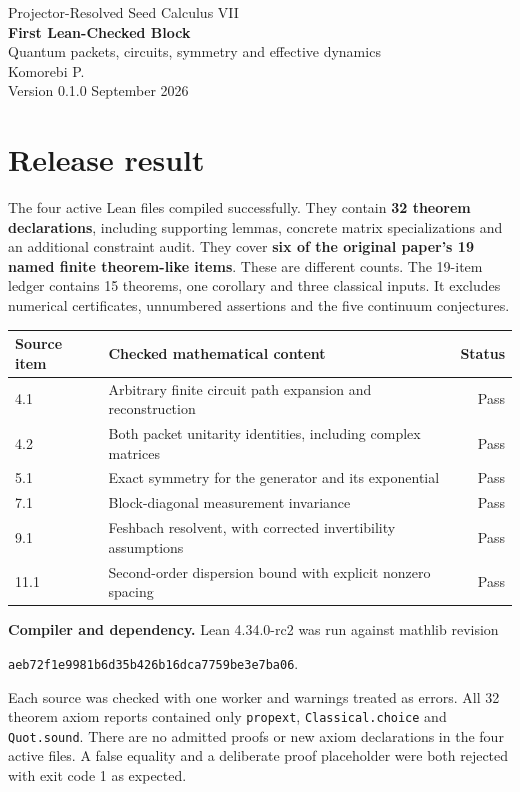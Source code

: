 \documentclass[11pt]{article}
\newcommand{\code}[1]{{\small\nolinkurl{#1}}}
\begin{document}
\thispagestyle{empty}
\begin{center}
{\large Projector-Resolved Seed Calculus VII}\\[7pt]
{\LARGE\bfseries First Lean-Checked Block}\\[9pt]
{\large Quantum packets, circuits, symmetry and effective dynamics}\\[12pt]
Komorebi P.\\
Version 0.1.0\quad\textbar{} September 2026
\end{center}

\section*{Release result}
The four active Lean files compiled successfully. They contain \textbf{32 theorem declarations}, including supporting lemmas, concrete matrix specializations and an additional constraint audit. They cover \textbf{six of the original paper's 19 named finite theorem-like items}. These are different counts. The 19-item ledger contains 15 theorems, one corollary and three classical inputs. It excludes numerical certificates, unnumbered assertions and the five continuum conjectures.

\begin{center}
\begin{tabularx}{\textwidth}{@{}lXr@{}}
\toprule
Source item & Checked mathematical content & Status\\
\midrule
4.1 & Arbitrary finite circuit path expansion and reconstruction & Pass\\
4.2 & Both packet unitarity identities, including complex matrices & Pass\\
5.1 & Exact symmetry for the generator and its exponential & Pass\\
7.1 & Block-diagonal measurement invariance & Pass\\
9.1 & Feshbach resolvent, with corrected invertibility assumptions & Pass\\
11.1 & Second-order dispersion bound with explicit nonzero spacing & Pass\\
\bottomrule
\end{tabularx}
\end{center}

\textbf{Compiler and dependency.} Lean 4.34.0-rc2 was run against mathlib revision
\begin{center}\code{aeb72f1e9981b6d35b426b16dca7759be3e7ba06}.\end{center}
Each source was checked with one worker and warnings treated as errors. All 32 theorem axiom reports contained only \code{propext}, \code{Classical.choice} and \code{Quot.sound}. There are no admitted proofs or new axiom declarations in the four active files. A false equality and a deliberate proof placeholder were both rejected with exit code 1 as expected.
\end{document}
